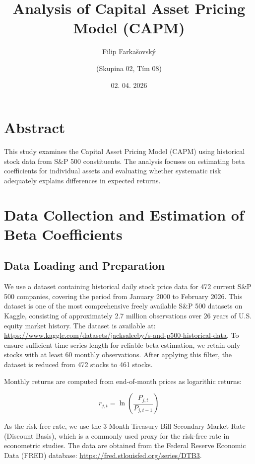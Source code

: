 \documentclass[
]{article}
\title{Analysis of Capital Asset Pricing Model (CAPM)}
\author{Filip Farkašovský \and (Skupina 02, Tím 08)}
\date{02. 04. 2026}
\begin{document}
\maketitle

{
\setcounter{tocdepth}{2}
\tableofcontents
}
\section*{Abstract}\label{abstract}

This study examines the Capital Asset Pricing Model (CAPM) using historical stock data from S\&P 500 constituents. The analysis focuses on estimating beta coefficients for individual assets and evaluating whether systematic risk adequately explains differences in expected returns.

\section{Data Collection and Estimation of Beta Coefficients}\label{data-collection-and-estimation-of-beta-coefficients}

\subsection{Data Loading and Preparation}\label{data-loading-and-preparation}

We use a dataset containing historical daily stock price data for 472 current S\&P 500 companies, covering the period from January 2000 to February 2026. This dataset is one of the most comprehensive freely available S\&P 500 datasets on Kaggle, consisting of approximately 2.7 million observations over 26 years of U.S. equity market history. The dataset is available at: \url{https://www.kaggle.com/datasets/jacksaleeby/s-and-p500-historical-data}. To ensure sufficient time series length for reliable beta estimation, we retain only stocks with at least 60 monthly observations. After applying this filter, the dataset is reduced from 472 stocks to 461 stocks.

Monthly returns are computed from end-of-month prices as logarithic returns:

\begin{equation}
r_{j,t} = \ln\left(\frac{P_{j,t}}{P_{j,t-1}}\right)
\end{equation}

As the risk-free rate, we use the 3-Month Treasury Bill Secondary Market Rate (Discount Basis), which is a commonly used proxy for the risk-free rate in econometric studies. The data are obtained from the Federal Reserve Economic Data (FRED) database: \url{https://fred.stlouisfed.org/series/DTB3}.
\end{document}
